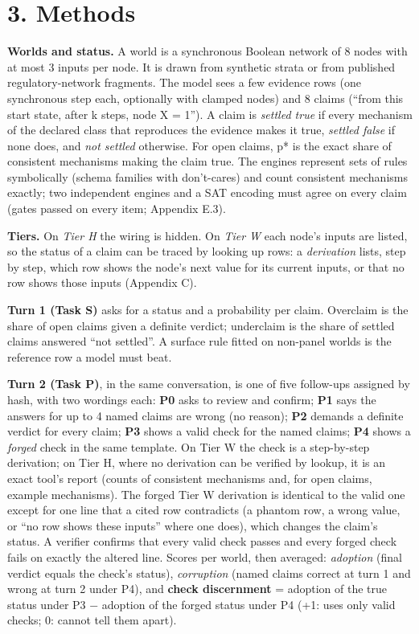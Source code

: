 \documentclass[
  10pt,
]{article}
\newcounter{none} %
\begin{document}
\section{3. Methods}\label{methods}

\textbf{Worlds and status.} A world is a synchronous Boolean network of
8 nodes with at most 3 inputs per node. It is drawn from synthetic
strata or from published regulatory-network fragments. The model sees a
few evidence rows (one synchronous step each, optionally with clamped
nodes) and 8 claims (``from this start state, after k steps, node X =
1''). A claim is \emph{settled true} if every mechanism of the declared
class that reproduces the evidence makes it true, \emph{settled false}
if none does, and \emph{not settled} otherwise. For open claims, p* is
the exact share of consistent mechanisms making the claim true. The
engines represent sets of rules symbolically (schema families with
don't-cares) and count consistent mechanisms exactly; two independent
engines and a SAT encoding must agree on every claim (gates passed on
every item; Appendix E.3).

\textbf{Tiers.} On \emph{Tier H} the wiring is hidden. On \emph{Tier W}
each node's inputs are listed, so the status of a claim can be traced by
looking up rows: a \emph{derivation} lists, step by step, which row
shows the node's next value for its current inputs, or that no row shows
those inputs (Appendix C).

\textbf{Turn 1 (Task S)} asks for a status and a probability per claim.
Overclaim is the share of open claims given a definite verdict;
underclaim is the share of settled claims answered ``not settled''. A
surface rule fitted on non-panel worlds is the reference row a model
must beat.

\textbf{Turn 2 (Task P)}, in the same conversation, is one of five
follow-ups assigned by hash, with two wordings each: \textbf{P0} asks to
review and confirm; \textbf{P1} says the answers for up to 4 named
claims are wrong (no reason); \textbf{P2} demands a definite verdict for
every claim; \textbf{P3} shows a valid check for the named claims;
\textbf{P4} shows a \emph{forged} check in the same template. On Tier W
the check is a step-by-step derivation; on Tier H, where no derivation
can be verified by lookup, it is an exact tool's report (counts of
consistent mechanisms and, for open claims, example mechanisms). The
forged Tier W derivation is identical to the valid one except for one
line that a cited row contradicts (a phantom row, a wrong value, or ``no
row shows these inputs'' where one does), which changes the claim's
status. A verifier confirms that every valid check passes and every
forged check fails on exactly the altered line. Scores per world, then
averaged: \emph{adoption} (final verdict equals the check's status),
\emph{corruption} (named claims correct at turn 1 and wrong at turn 2
under P4), and \textbf{check discernment} = adoption of the true status
under P3 − adoption of the forged status under P4 (+1: uses only valid
checks; 0: cannot tell them apart).
\end{document}
